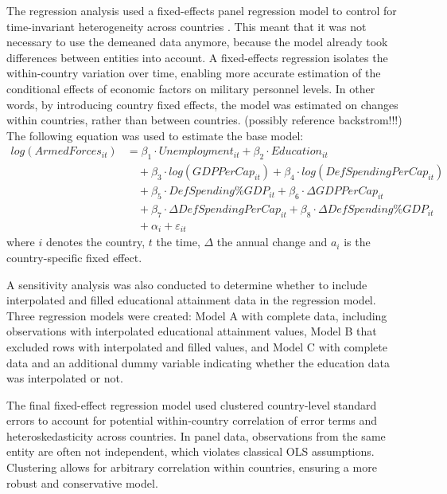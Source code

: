 The regression analysis used a fixed-effects panel regression model to control for time-invariant 
heterogeneity across countries \parencite{backstrom_are_2019}. This meant that it was not 
necessary to 
use the demeaned data anymore, because the model already took differences between entities into account.
A fixed-effects regression isolates the within-country variation over time, enabling more accurate 
estimation of the conditional effects of economic factors on military personnel levels.
In other words, by introducing country fixed effects, the model was estimated on changes within 
countries, rather than between countries. (possibly reference backstrom!!!) 
The following equation was used to estimate the base model:
\begin{align*}
log(ArmedForces_{it}) &= \beta_1 \cdot Unemployment_{it} 
+ \beta_2 \cdot Education_{it} \\
&\quad + \beta_3 \cdot log(GDPPerCap_{it}) 
+ \beta_4 \cdot log(DefSpendingPerCap_{it}) \\
&\quad + \beta_5 \cdot DefSpending\%GDP_{it} 
+ \beta_6 \cdot \Delta GDPPerCap_{it} \\
&\quad + \beta_7 \cdot \Delta DefSpendingPerCap_{it} 
+ \beta_8 \cdot \Delta DefSpending\%GDP_{it} \\
&\quad + \alpha_i + \varepsilon_{it}
\end{align*}
where $i$ denotes the country, $t$ the time, $\Delta$ the annual change and 
$a_i$ is the country-specific fixed effect.

A sensitivity analysis was also conducted to determine whether to include interpolated and filled educational 
attainment data in the regression model. Three regression models were created: Model A with 
complete data, including observations with interpolated educational attainment values, Model B 
that excluded rows with interpolated and filled values, and Model C with complete data and an additional 
dummy variable indicating whether the education data was interpolated or not.

The final fixed-effect regression model used clustered country-level standard errors to 
account for potential within-country correlation of error terms and heteroskedasticity across 
countries. In panel data, observations from the same entity are often not independent, which 
violates classical OLS assumptions. Clustering allows for arbitrary correlation within 
countries, ensuring a more robust and conservative model.